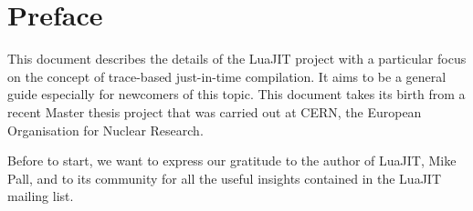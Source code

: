 \section*{\centering Preface}

\thispagestyle{empty}
\vspace{1cm}

This document describes the details of the LuaJIT project with a particular focus on the concept of trace-based just-in-time compilation. It aims to be a general guide especially for newcomers of this topic. This document takes its birth from a recent Master thesis project \cite{dandrea2019madng} that was carried out at CERN, the European Organisation for Nuclear Research.

Before to start, we want to express our gratitude to the author of LuaJIT, Mike Pall, and to its community for all the useful insights contained in the LuaJIT mailing list.


\newpage